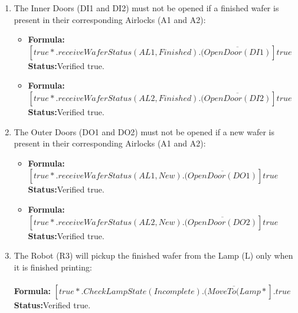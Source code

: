 \documentclass[a4paper,12pt]{article}
\begin{document}
\begin{enumerate}
\item The Inner Doors (DI1 and DI2) must not be opened if a finished wafer is present in their corresponding Airlocks (A1 and A2):
    \begin{itemize}
	\item \textbf{Formula:} $[true*.receiveWaferStatus(AL1,Finished).(\overline{OpenDoor(DI1)}]true$ 
	\\\textbf{Status:}Verified true.
    \item \textbf{Formula:} $[true*.receiveWaferStatus(AL2,Finished).(\overline{OpenDoor(DI2)}]true$  
    \\\textbf{Status:}Verified true.
	\end{itemize}


\item The Outer Doors (DO1 and DO2) must not be opened if a new wafer is present in their corresponding Airlocks (A1 and A2):
\begin{itemize}
	\item \textbf{Formula:} $[true*.receiveWaferStatus(AL1,New).(\overline{OpenDoor(DO1)}]true$ 
	\\\textbf{Status:}Verified true.
    \item \textbf{Formula:} $[true*.receiveWaferStatus(AL2,New).(\overline{OpenDoor(DO2)}]true$  
    \\\textbf{Status:}Verified true.
	\end{itemize}


\item The Robot (R3) will pickup the finished wafer from the Lamp (L) only when it is finished printing:
\\
\\\textbf{Formula:} $[true*.CheckLampState(Incomplete).(\overline{MoveTo(Lamp}*].true$ \\\textbf{Status:}Verified true.




\end{enumerate}
\end{document}
